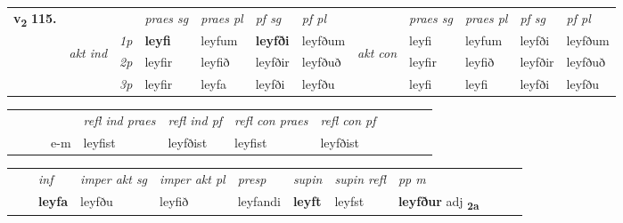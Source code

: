 \begin{tabular}{llllllllllll} \toprule
\multirow{4}{*}{{{\textbf{v{\textsubscript{2}}} \Large{\textbf{115.}}}}}  & &   &  \textit{praes sg}  & \textit{praes pl}  &\textit{ pf sg} & \textit{pf pl} &  &  \textit{praes sg}  & \textit{praes pl}  & \textit{pf sg} & \textit{pf pl } \\*
	\cmidrule{4-7} \cmidrule{9-12}
 & \multirow{3}{*}{\begin{turn}{90}\textit{akt ind}\end{turn}} & {\textit{1p}} & \textbf{leyfi} & leyfum    & \textbf{leyfði} & leyfðum & \multirow{3}{*}{\begin{turn}{90}\textit{akt con}\end{turn}} &leyfi & leyfum & leyfði & leyfðum\\*
& &  {\textit{2p}} &  leyfir  & leyfið   & leyfðir & leyfðuð & & leyfir & leyfið & leyfðir & leyfðuð \\*
& &  {\textit{3p}} & leyfir & leyfa   & leyfði & leyfðu & & leyfi & leyfi& leyfði & leyfðu  \\*
\cmidrule{4-7} \cmidrule{9-12}
\end{tabular}


\begin{tabular}{llllllllllll}
 & &  & &  \textit{refl ind praes} & \textit{refl ind pf} & \textit{refl con praes} & \textit{refl con pf} \\*
&  & & e-m & leyfist & leyfðist & leyfist & leyfðist \\*
\cmidrule{5-9}
\end{tabular}


\begin{tabular}{llllllllllll}
 & & \textit{inf} & \textit{imper akt sg} & \textit{imper akt pl}   & \textit{presp} & \textit{supin} & \textit{supin refl} & \textit{pp m}     \\*
  & & \textbf{leyfa} & leyfðu  & leyfið   & leyfandi &  \textbf{leyft} & leyfst & \textbf{leyfður} adj \textbf{\textsubscript{2a}} \\*
\cmidrule{1-12}
\end{tabular}



